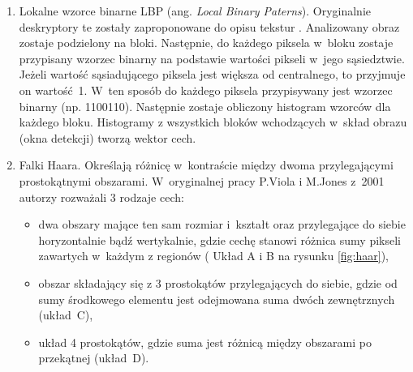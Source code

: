 \begin{enumerate}

\item Lokalne wzorce binarne LBP (ang. \textit{Local Binary Paterns}).
Oryginalnie deskryptory te zostały zaproponowane  do opisu tekstur \cite{ojala2002multiresolution}. %
Analizowany obraz zostaje podzielony na bloki.
Następnie, do każdego piksela w~bloku zostaje przypisany wzorzec binarny na podstawie wartości pikseli w~jego sąsiedztwie.
Jeżeli wartość sąsiadującego piksela jest większa od centralnego, to przyjmuje on wartość~1. 
W~ten sposób do każdego piksela przypisywany jest wzorzec binarny (np. 1100110). %
Następnie zostaje obliczony histogram wzorców dla każdego bloku.
Histogramy z wszystkich bloków wchodzących w~skład obrazu (okna detekcji) tworzą wektor cech.

\item Falki Haara.
Określają różnicę w~kontraście między dwoma przylegającymi prostokątnymi obszarami. 
W~oryginalnej pracy P.Viola i M.Jones z~2001 \cite{viola2001rapid} autorzy rozważali 3 rodzaje cech: 
\begin{itemize}
	\item dwa obszary mające ten sam rozmiar i~kształt oraz przylegające do siebie horyzontalnie bądź wertykalnie, gdzie cechę stanowi różnica sumy pikseli zawartych w~każdym z regionów ( Układ A i B na rysunku \ref{fig:haar}), 
	\item obszar składający się z 3 prostokątów przylegających do siebie, gdzie od sumy środkowego elementu jest odejmowana suma dwóch zewnętrznych (układ~C),
	\item układ 4 prostokątów, gdzie suma jest różnicą między obszarami po przekątnej (układ~D). %
\end{itemize}


\end{enumerate}

